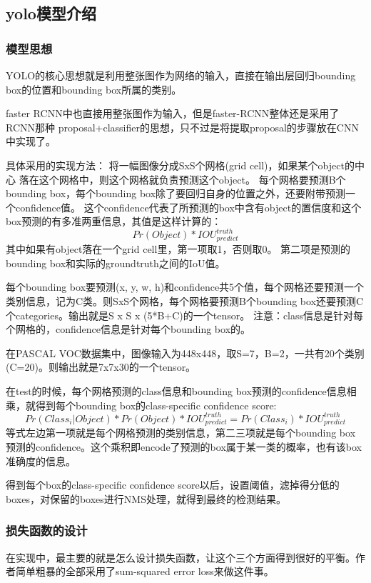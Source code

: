 \documentclass[openany]{ctexbook}
\begin{document}
\subsection{yolo模型介绍}
\subsubsection{模型思想}
YOLO的核心思想就是利用整张图作为网络的输入，直接在输出层回归bounding box的位置和bounding box所属的类别。

faster RCNN中也直接用整张图作为输入，但是faster-RCNN整体还是采用了RCNN那种 proposal+classifier的思想，只不过是将提取proposal的步骤放在CNN中实现了。

具体采用的实现方法：
将一幅图像分成SxS个网格(grid cell)，如果某个object的中心 落在这个网格中，则这个网格就负责预测这个object。
每个网格要预测B个bounding box，每个bounding box除了要回归自身的位置之外，还要附带预测一个confidence值。
这个confidence代表了所预测的box中含有object的置信度和这个box预测的有多准两重信息，其值是这样计算的：
$$Pr(Object)*IOU^{truth}_{predict}$$
其中如果有object落在一个grid cell里，第一项取1，否则取0。 第二项是预测的bounding box和实际的groundtruth之间的IoU值。

每个bounding box要预测(x, y, w, h)和confidence共5个值，每个网格还要预测一个类别信息，记为C类。则SxS个网格，每个网格要预测B个bounding box还要预测C个categories。输出就是S x S x (5*B+C)的一个tensor。
注意：class信息是针对每个网格的，confidence信息是针对每个bounding box的。

在PASCAL VOC数据集中，图像输入为448x448，取S=7，B=2，一共有20个类别(C=20)。则输出就是7x7x30的一个tensor。

在test的时候，每个网格预测的class信息和bounding box预测的confidence信息相乘，就得到每个bounding box的class-specific confidence score:
$$Pr(Class_i|Object)*Pr(Object)*IOU^{truth}_{predict}=Pr(Class_i)*IOU^{truth}_{predict}$$
等式左边第一项就是每个网格预测的类别信息，第二三项就是每个bounding box预测的confidence。这个乘积即encode了预测的box属于某一类的概率，也有该box准确度的信息。

得到每个box的class-specific confidence score以后，设置阈值，滤掉得分低的boxes，对保留的boxes进行NMS处理，就得到最终的检测结果。
\subsubsection{损失函数的设计}
在实现中，最主要的就是怎么设计损失函数，让这个三个方面得到很好的平衡。作者简单粗暴的全部采用了sum-squared error loss来做这件事。
\end{document}
